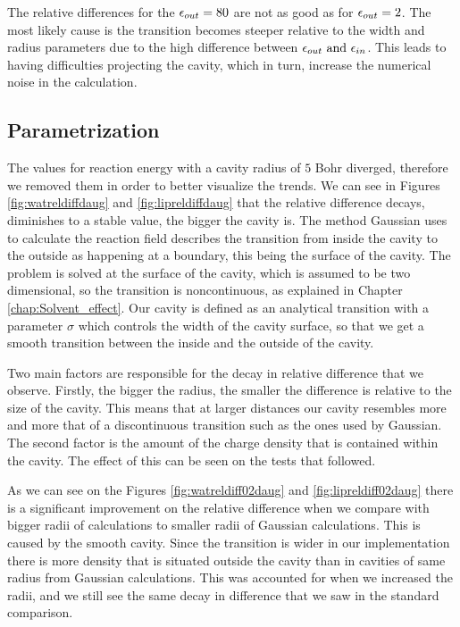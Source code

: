 \documentclass[../Thesis.tex]{subfiles}
\begin{document}
The relative differences for the $\epsilon_{out} = 80$ are not as good as for $\epsilon_{out} = 2$.
The most likely cause is the transition becomes steeper relative
to the width and radius parameters due to the high difference between $\epsilon_{out} \text{ and } \epsilon_{in}$.
This leads to \mrchem having difficulties projecting the cavity, which in turn,
increase the numerical noise in the calculation.

\subsection{Parametrization }
The values for  reaction energy with a cavity radius of $5$ Bohr diverged, therefore
we removed them in order to better visualize the trends.
We can see in Figures \ref{fig:watreldiffdaug} and \ref{fig:lipreldiffdaug}
that the relative difference decays, diminishes to a stable value, the bigger the cavity is. The method Gaussian
uses to calculate the reaction field describes the transition from inside the
cavity to the outside as happening at a boundary, this being the surface of the cavity.
The problem is solved at the surface of the cavity, which is assumed to be two dimensional,
so the transition is noncontinuous, as explained in Chapter \ref{chap:Solvent_effect}.
Our cavity is defined as an analytical transition with a parameter $\sigma$ which
controls the width of the cavity surface, so that we get a smooth transition
between the inside and the outside of the cavity.

Two main factors are responsible for the decay in relative difference that we observe.
Firstly, the bigger the radius, the smaller the difference is relative to the
size of the cavity. This means that at larger distances our cavity resembles
more and more that of a discontinuous transition such as the ones used by
Gaussian. The second factor is the amount of the charge density that is contained within
the cavity. The effect of this can be seen on the tests that followed.

As we can see on the Figures \ref{fig:watreldiff02daug} and \ref{fig:lipreldiff02daug}
there is a significant improvement on the relative difference when we compare with
bigger radii of \mrchem calculations to smaller radii of Gaussian calculations.
This is caused by the smooth cavity. Since the transition is wider in our implementation
there is more density that is situated outside the cavity than in cavities of same radius
from Gaussian calculations. This was accounted for when we increased the radii, and we still
see the same decay in difference that we saw in the standard comparison.
\end{document}
